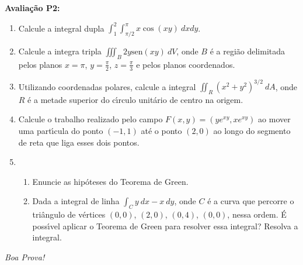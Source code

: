 \documentclass[a4paper,5pt]{amsbook}
\newcommand{\sen}{\text{sen}}
\newcommand{\ds}{\displaystyle}
\begin{document}
\textbf{Avalia\c{c}\~ao P2:}
\begin{enumerate}
\item Calcule a integral dupla $\ds\int_1^2\int_{\pi/2}^{\pi} x\cos(xy)\ dxdy$.
\vspace{0.5cm}

\item Calcule a integra tripla $\ds\iiint_B 2y\sen(xy)\ dV$, onde $B$ \'e
	a regi\~ao delimitada pelos planos $\ds x=\pi$, $\ds y=\frac{\pi}{2}$, $\ds
	z=\frac{\pi}{3}$ e pelos planos coordenados.
\vspace{0.5cm}

\item Utilizando coordenadas polares, calcule a integral $\ds \iint_R
	{(x^2+y^2)}^{3/2}\ dA$, onde $R$ \'e a metade superior do c\'{\i}rculo unit\'ario de
	centro na origem.
\vspace{0.5cm}

\item Calcule o trabalho realizado pelo campo $F(x,y) = (ye^{xy}, xe^{xy})$ ao
	mover uma part\'{\i}cula do ponto $(-1,1)$ at\'e o ponto $(2,0)$ ao longo do
	segmento de reta que liga esses dois pontos.
\vspace{0.5cm}

\item
	\begin{enumerate}
		\item Enuncie as hip\'oteses do Teorema de Green.
		\item Dada a integral de linha $\ds\int_C y\ dx - x\ dy$, onde $C$ \'e a
			curva que percorre o tri\^angulo de v\'ertices $(0,0)$, $(2,0)$, $(0,4)$,
			$(0,0)$, nessa ordem. \'{E} poss\'{\i}vel aplicar o Teorema de Green
			para resolver essa integral? Resolva a integral.
	\end{enumerate}
\end{enumerate}

\begin{flushright}
	\textit{Boa Prova!}
\end{flushright}
\end{document}
